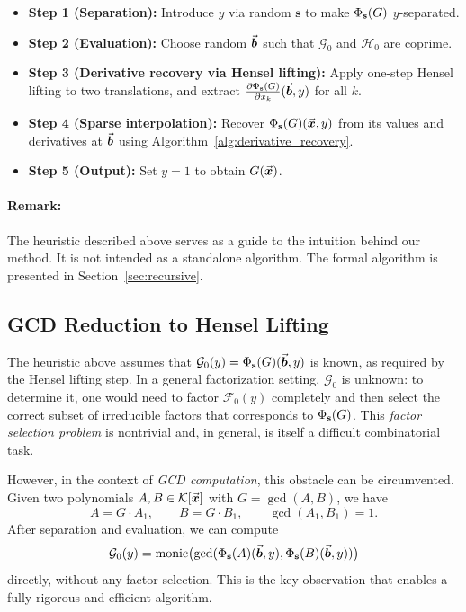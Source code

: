 \documentclass{article}
\numberwithin{equation}{section}
\begin{document}
\begin{itemize}
    \item \textbf{Step 1 (Separation):} Introduce $y$ via random $\mathbf{s}$ to make $\Phi_{\mathbf{s}}(G)$ $y$-separated.
    \item \textbf{Step 2 (Evaluation):} Choose random $\vec{\boldsymbol{b}}$ such that $\mathcal{G}_0$ and $\mathcal{H}_0$ are coprime.
    \item \textbf{Step 3 (Derivative recovery via Hensel lifting):} Apply one-step Hensel lifting to two translations, and extract $\frac{\partial \Phi_{\mathbf{s}}(G)}{\partial x_k}(\vec{\boldsymbol{b}}, y)$ for all $k$.
    \item \textbf{Step 4 (Sparse interpolation):} Recover $\Phi_{\mathbf{s}}(G)(\vec{\boldsymbol{x}}, y)$ from its values and derivatives at $\vec{\boldsymbol{b}}$ using Algorithm~\ref{alg:derivative_recovery}.
    \item \textbf{Step 5 (Output):} Set $y = 1$ to obtain $G(\vec{\boldsymbol{x}})$.
\end{itemize}

\paragraph{Remark:} 
The heuristic described above serves as a guide to the intuition behind our method. It is not intended as a standalone algorithm. The formal algorithm is presented in Section~\ref{sec:recursive}.



\subsection{GCD Reduction to Hensel Lifting}

The heuristic above assumes that $\mathcal{G}_0(y) = \Phi_{\mathbf{s}}(G)(\vec{\boldsymbol{b}}, y)$ is known, as required by the Hensel lifting step. In a general factorization setting, $\mathcal{G}_0$ is unknown: to determine it, one would need to factor $\mathcal{F}_0(y)$ completely and then select the correct subset of irreducible factors that corresponds to $\Phi_{\mathbf{s}}(G)$. This \emph{factor selection problem} is nontrivial and, in general, is itself a difficult combinatorial task.

However, in the context of \emph{GCD computation}, this obstacle can be circumvented. Given two polynomials $A, B \in {\mathcal{K}}[\vec{\boldsymbol{x}}]$ with $G = \gcd(A, B)$, we have
\[
A = G \cdot A_1, \qquad B = G \cdot B_1, \qquad \gcd(A_1, B_1) = 1.
\]
After separation and evaluation, we can compute
\[
\mathcal{G}_0(y) = \operatorname{monic}\bigl( \gcd( \Phi_{\mathbf{s}}(A)(\vec{\boldsymbol{b}}, y), \Phi_{\mathbf{s}}(B)(\vec{\boldsymbol{b}}, y) ) \bigr)
\]
directly, without any factor selection. This is the key observation that enables a fully rigorous and efficient algorithm.
\end{document}
